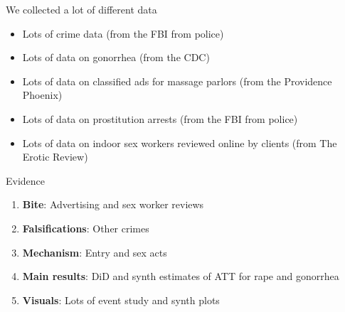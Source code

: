 \documentclass{beamer}
\begin{document}







\begin{frame}{We collected a lot of different data}
\begin{itemize}
	\item Lots of crime data (from the FBI from police)
	\item Lots of data on gonorrhea (from the CDC)
	\item Lots of data on classified ads for massage parlors (from the Providence Phoenix)
	\item Lots of data on prostitution arrests (from the FBI from police)
	\item Lots of data on indoor sex workers reviewed online by clients (from The Erotic Review)
\end{itemize}
\end{frame}

\begin{frame}{Evidence}

\begin{enumerate}
\item \textbf{Bite}: Advertising and sex worker reviews
\item \textbf{Falsifications}: Other crimes
\item \textbf{Mechanism}: Entry and sex acts
\item \textbf{Main results}: DiD and synth estimates of ATT for rape and gonorrhea
\item \textbf{Visuals}: Lots of event study and synth plots
\end{enumerate}

\end{frame}
\end{document}
